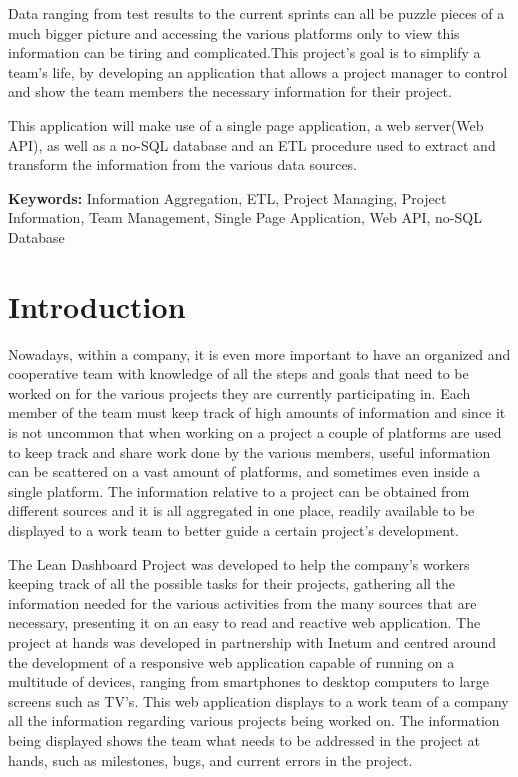 \documentclass[a4paper,twoside,10pt]{report}
\begin{document}
Data ranging from test results to the current sprints can all be puzzle pieces of a much bigger picture and accessing the various platforms only to view this information can be tiring and complicated.This project's goal is to simplify a team's life, by developing an application that allows a project manager to control and show the team members the necessary information for their project.

This application will make use of a single page application, a web server(Web API), as well as a no-SQL database and an ETL procedure used to extract and transform the information from the various data sources.


\textbf{Keywords:} Information Aggregation, ETL, Project Managing, Project Information, Team Management, Single Page Application, Web API, no-SQL Database


\newpage
\tableofcontents{}
\newpage

\chapter{Introduction}

Nowadays, within a company, it is even more important to have an organized and cooperative team with knowledge of all the steps and goals that need to be worked on for the various projects they are currently participating in.
Each member of the team must keep track of high amounts of information and since it is not uncommon that when working on a project a couple of platforms are used to keep track and share work done by the various members, useful information can be scattered on a vast amount of platforms, and sometimes even inside a single platform.
The information relative to a project can be obtained from different sources and it is all aggregated in one place, readily available to be displayed to a work team to better guide a certain project's development.

The Lean Dashboard Project was developed to help the company's workers keeping track of all the possible tasks for their projects, gathering all the information needed for the various activities from the many sources that are necessary, presenting it on an easy to read and reactive web application.
The project at hands was developed in partnership with Inetum\cite{INETUM} and centred around the development of a responsive web application capable of running on a multitude of devices, ranging from smartphones to desktop computers to large screens such as TV’s. This web application displays to a work team of a company all the information regarding various projects being worked on. 
The information being displayed shows the team what needs to be addressed in the project at hands, such as milestones, bugs, and current errors in the project.
\end{document}
